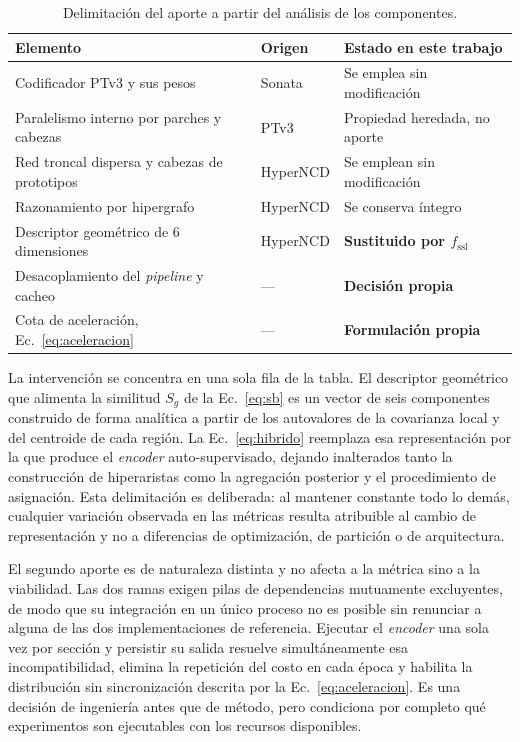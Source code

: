 \begin{table}[H]
\centering
\caption{Delimitación del aporte a partir del análisis de los componentes.}
\label{tab:atribucion}
\begin{tabular}{@{}p{4.3cm}p{4.1cm}p{4.1cm}@{}}
\toprule
\textbf{Elemento} & \textbf{Origen} & \textbf{Estado en este trabajo} \\
\midrule
Codificador PTv3 y sus pesos & Sonata & Se emplea sin modificación \\
Paralelismo interno por parches y cabezas & PTv3 & Propiedad heredada, no aporte \\
Red troncal dispersa y cabezas de prototipos & HyperNCD & Se emplean sin modificación \\
Razonamiento por hipergrafo & HyperNCD & Se conserva íntegro \\
Descriptor geométrico de 6 dimensiones & HyperNCD & \textbf{Sustituido por $f_{\mathrm{ssl}}$} \\
Desacoplamiento del \emph{pipeline} y cacheo & --- & \textbf{Decisión propia} \\
Cota de aceleración, Ec.~\eqref{eq:aceleracion} & --- & \textbf{Formulación propia} \\
\bottomrule
\end{tabular}
\end{table}

La intervención se concentra en una sola fila de la tabla. El descriptor
geométrico que alimenta la similitud $S_g$ de la Ec.~\eqref{eq:sb} es un vector
de seis componentes construido de forma analítica a partir de los autovalores de
la covarianza local y del centroide de cada región. La Ec.~\eqref{eq:hibrido}
reemplaza esa representación por la que produce el \emph{encoder}
auto-supervisado, dejando inalterados tanto la construcción de hiperaristas como
la agregación posterior y el procedimiento de asignación. Esta delimitación es
deliberada: al mantener constante todo lo demás, cualquier variación observada en
las métricas resulta atribuible al cambio de representación y no a diferencias de
optimización, de partición o de arquitectura.

El segundo aporte es de naturaleza distinta y no afecta a la métrica sino a la
viabilidad. Las dos ramas exigen pilas de dependencias mutuamente excluyentes, de
modo que su integración en un único proceso no es posible sin renunciar a alguna
de las dos implementaciones de referencia. Ejecutar el \emph{encoder} una sola
vez por sección y persistir su salida resuelve simultáneamente esa incompatibilidad,
elimina la repetición del costo en cada época y habilita la distribución sin
sincronización descrita por la Ec.~\eqref{eq:aceleracion}. Es una decisión de
ingeniería antes que de método, pero condiciona por completo qué experimentos son
ejecutables con los recursos disponibles.
